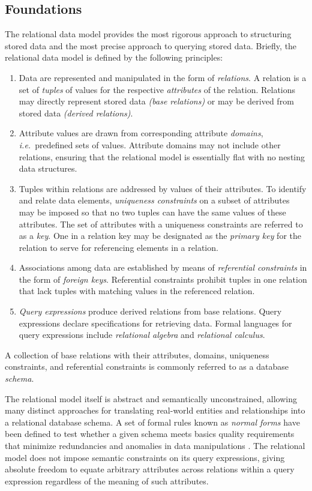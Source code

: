 \documentclass[letter,10pt]{article}
\begin{document}
\subsection{Foundations}
The relational data model \citep{codd_relational_1970} provides the most rigorous approach to structuring stored data and the most precise approach to querying stored data.  
Briefly, the relational data model is defined by the following principles:
\begin{enumerate}
\item Data are represented and manipulated in the form of \emph{relations}. 
A relation is a set of \emph{tuples} of values for the respective \emph{attributes} of the relation.
Relations may directly represent stored data \emph{(base relations)} or may be derived from stored data \emph{(derived relations)}.
\item Attribute values are drawn from corresponding attribute \emph{domains}, \emph{i.e.}\ predefined sets of values.
Attribute domains may not include other relations, ensuring that the relational model is essentially flat with no nesting data structures.
\item Tuples within relations are addressed by values of their attributes.
To identify and relate data elements, \emph{uniqueness constraints} on a subset of attributes may be imposed so that no two tuples can have the same values of these attributes.  The set of attributes with a uniqueness constraints are referred to as a \emph{key}. One in a relation key may be designated as the \emph{primary key} for the relation to serve for referencing elements in a relation.
\item Associations among data are established by means of \emph{referential constraints} in the form of \emph{foreign keys}. 
Referential constraints prohibit tuples in one relation that lack tuples with matching values in the referenced relation. 
\item \emph{Query expressions} produce derived relations from base relations.  Query expressions declare specifications for retrieving data.
Formal languages for query expressions include \emph{relational algebra} and \emph{relational calculus}.  
\end{enumerate}

A collection of base relations with their attributes, domains, uniqueness constraints, and referential constraints is commonly referred to as a database \emph{schema}.

The relational model itself is abstract and semantically unconstrained, allowing many distinct approaches for translating real-world entities and relationships into a relational database schema. 
A set of formal rules known as \emph{normal forms} have been defined to test whether a given schema meets basics quality requirements that minimize redundancies and anomalies in data manipulations \citep{kent-1983-simple}.
The relational model does not impose semantic constraints on its query expressions, giving absolute freedom to equate arbitrary attributes across relations within a query expression regardless of the meaning of such attributes.
\end{document}
